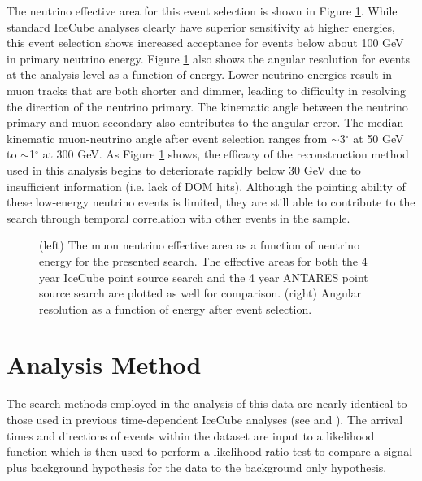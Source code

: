 \documentclass[manuscript]{aastex}
\begin{document}
The neutrino effective area for this event selection is shown in Figure \ref{fig:EffAreaAndAngularResolution}. While standard IceCube analyses clearly have superior sensitivity at higher energies, this event selection shows increased acceptance for events below about 100 GeV in primary neutrino energy. Figure \ref{fig:EffAreaAndAngularResolution} also shows the angular resolution for events at the analysis level as a function of energy. Lower neutrino energies result in muon tracks that are both shorter and dimmer, leading to difficulty in resolving the direction of the neutrino primary. The kinematic angle between the neutrino primary and muon secondary also contributes to the angular error. The median kinematic muon-neutrino angle after event selection ranges from $\sim$3$^{\circ}$ at 50 GeV to $\sim$1$^{\circ}$ at 300 GeV. As Figure \ref{fig:EffAreaAndAngularResolution} shows, the efficacy of the reconstruction method used in this analysis begins to deteriorate rapidly below 30 GeV due to insufficient information (i.e. lack of DOM hits). Although the pointing ability of these low-energy neutrino events is limited, they are still able to contribute to the search through temporal correlation with other events in the sample.
\begin{figure}[ht]
\caption[Analysis Effective Area and Angular Resolution]{(left) The muon neutrino effective area as a function of neutrino energy for the presented search. The effective areas for both the 4 year IceCube point source search \citep{2014ApJ...796..109A} and the 4 year ANTARES point source search \citep{2012ApJ...760...53A} are plotted as well for comparison. (right) Angular resolution as a function of energy after event selection.}
\label{fig:EffAreaAndAngularResolution}
\end{figure}


\section{Analysis Method}
The search methods employed in the analysis of this data are nearly identical to those used in previous time-dependent IceCube analyses (see \cite{2008APh....29..299B} and \cite{0004-637X-807-1-46}). The arrival times and directions of events within the dataset are input to a likelihood function which is then used to perform a likelihood ratio test to compare a signal plus background hypothesis for the data to the background only hypothesis.
\end{document}
